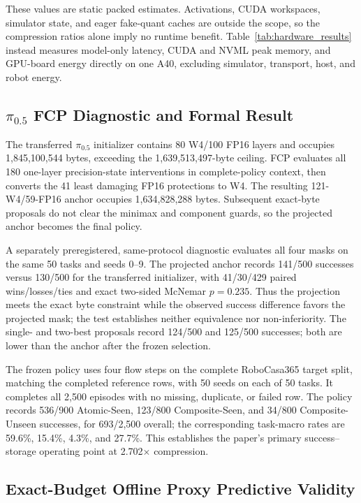 These values are static packed estimates. Activations, CUDA workspaces, simulator state, and eager fake-quant caches are outside the scope, so the compression ratios alone imply no runtime benefit. Table~\ref{tab:hardware_results} instead measures model-only latency, CUDA and NVML peak memory, and GPU-board energy directly on one A40, excluding simulator, transport, host, and robot energy.

\subsection{\texorpdfstring{$\pi_{0.5}$}{pi0.5} FCP Diagnostic and Formal Result}

The transferred $\pi_{0.5}$ initializer contains 80 W4/100 FP16 layers and occupies 1,845,100,544 bytes, exceeding the 1,639,513,497-byte ceiling. FCP evaluates all 180 one-layer precision-state interventions in complete-policy context, then converts the 41 least damaging FP16 protections to W4. The resulting 121-W4/59-FP16 anchor occupies 1,634,828,288 bytes. Subsequent exact-byte proposals do not clear the minimax and component guards, so the projected anchor becomes the final policy.



A separately preregistered, same-protocol diagnostic evaluates all four masks on the same 50 tasks and seeds 0--9. The projected anchor records 141/500 successes versus 130/500 for the transferred initializer, with 41/30/429 paired wins/losses/ties and exact two-sided McNemar $p=0.235$. Thus the projection meets the exact byte constraint while the observed success difference favors the projected mask; the test establishes neither equivalence nor non-inferiority. The single- and two-best proposals record 124/500 and 125/500 successes; both are lower than the anchor after the frozen selection.

The frozen policy uses four flow steps on the complete RoboCasa365 target split, matching the completed reference rows, with 50 seeds on each of 50 tasks. It completes all 2,500 episodes with no missing, duplicate, or failed row. The policy records 536/900 Atomic-Seen, 123/800 Composite-Seen, and 34/800 Composite-Unseen successes, for 693/2,500 overall; the corresponding task-macro rates are 59.6\%, 15.4\%, 4.3\%, and 27.7\%. This establishes the paper's primary success--storage operating point at 2.702$\times$ compression.

\subsection{Exact-Budget Offline Proxy Predictive Validity}
\label{sec:predictive_validity}

